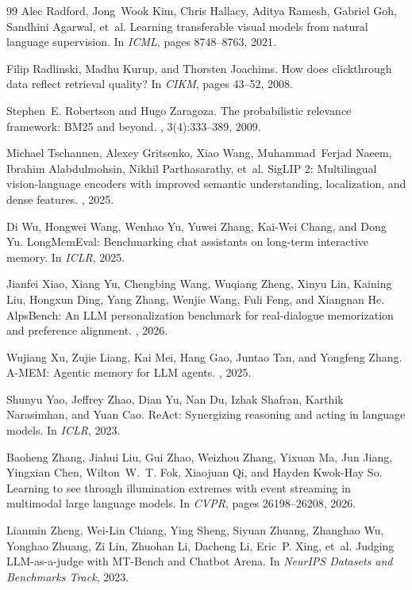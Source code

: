\documentclass[10pt,twocolumn,letterpaper]{article}
\begin{document}
\begin{thebibliography}{99}
Alec Radford, Jong~Wook Kim, Chris Hallacy, Aditya Ramesh, Gabriel Goh, Sandhini Agarwal, et~al.
\newblock Learning transferable visual models from natural language supervision.
\newblock In {\em ICML}, pages 8748--8763, 2021.

Filip Radlinski, Madhu Kurup, and Thorsten Joachims.
\newblock How does clickthrough data reflect retrieval quality?
\newblock In {\em CIKM}, pages 43--52, 2008.

Stephen~E. Robertson and Hugo Zaragoza.
\newblock The probabilistic relevance framework: BM25 and beyond.
, 3(4):333--389, 2009.

Michael Tschannen, Alexey Gritsenko, Xiao Wang, Muhammad~Ferjad Naeem, Ibrahim Alabdulmohsin, Nikhil Parthasarathy, et~al.
\newblock SigLIP 2: Multilingual vision-language encoders with improved semantic understanding, localization, and dense features.
, 2025.

Di Wu, Hongwei Wang, Wenhao Yu, Yuwei Zhang, Kai-Wei Chang, and Dong Yu.
\newblock LongMemEval: Benchmarking chat assistants on long-term interactive memory.
\newblock In {\em ICLR}, 2025.

Jianfei Xiao, Xiang Yu, Chengbing Wang, Wuqiang Zheng, Xinyu Lin, Kaining Liu, Hongxun Ding, Yang Zhang, Wenjie Wang, Fuli Feng, and Xiangnan He.
\newblock AlpsBench: An LLM personalization benchmark for real-dialogue memorization and preference alignment.
, 2026.

Wujiang Xu, Zujie Liang, Kai Mei, Hang Gao, Juntao Tan, and Yongfeng Zhang.
\newblock A-MEM: Agentic memory for LLM agents.
, 2025.

Shunyu Yao, Jeffrey Zhao, Dian Yu, Nan Du, Izhak Shafran, Karthik Narasimhan, and Yuan Cao.
\newblock ReAct: Synergizing reasoning and acting in language models.
\newblock In {\em ICLR}, 2023.

Baoheng Zhang, Jiahui Liu, Gui Zhao, Weizhou Zhang, Yixuan Ma, Jun Jiang, Yingxian Chen, Wilton~W.~T. Fok, Xiaojuan Qi, and Hayden Kwok-Hay So.
\newblock Learning to see through illumination extremes with event streaming in multimodal large language models.
\newblock In {\em CVPR}, pages 26198--26208, 2026.

Lianmin Zheng, Wei-Lin Chiang, Ying Sheng, Siyuan Zhuang, Zhanghao Wu, Yonghao Zhuang, Zi Lin, Zhuohan Li, Dacheng Li, Eric~P. Xing, et~al.
\newblock Judging LLM-as-a-judge with MT-Bench and Chatbot Arena.
\newblock In {\em NeurIPS Datasets and Benchmarks Track}, 2023.

\end{thebibliography}
\normalsize
\end{document}
